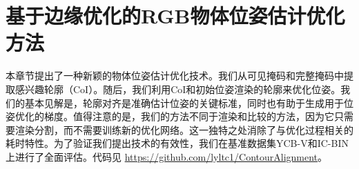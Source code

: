 \chapter{基于边缘优化的RGB物体位姿估计优化方法}

本章节提出了一种新颖的物体位姿估计优化技术。我们从可见掩码和完整掩码中提取感兴趣轮廓（CoI）。随后，我们利用CoI和初始位姿渲染的轮廓来优化位姿。我们的基本见解是，轮廓对齐是准确估计位姿的关键标准，同时也有助于生成用于位姿优化的梯度。值得注意的是，我们的方法不同于渲染和比较的方法，因为它只需要渲染分割，而不需要训练新的优化网络。这一独特之处消除了与优化过程相关的耗时特性。为了验证我们提出技术的有效性，我们在基准数据集YCB-V和IC-BIN上进行了全面评估。代码见 \href{https://github.com/lyltc1/ContourAlignment}{https://github.com/lyltc1/ContourAlignment}。

